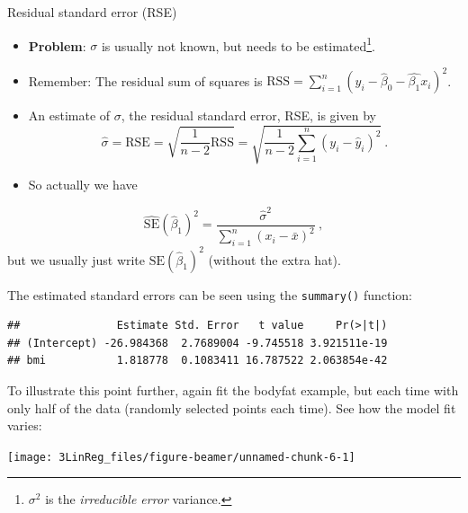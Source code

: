 \documentclass[10pt,ignorenonframetext,]{beamer}
\newenvironment{Shaded}{\begin{snugshade}}{\end{snugshade}}
\newcommand{\KeywordTok}[1]{\textcolor[rgb]{0.13,0.29,0.53}{\textbf{#1}}}
\newcommand{\OperatorTok}[1]{\textcolor[rgb]{0.81,0.36,0.00}{\textbf{#1}}}
\newcommand{\NormalTok}[1]{#1}
\begin{document}
\begin{frame}

\begin{block}{Residual standard error (RSE)}

\vspace{2mm}

\begin{itemize}
\item
  \textbf{Problem}: \(\sigma\) is usually not known, but needs to be
  estimated\footnote{$\sigma^2$ is the \emph{irreducible error} variance.}.
\item
  Remember: The residual sum of squares is
  \(\text{RSS}=\sum_{i=1}^n (y_i-\hat{\beta}_0-\hat{\beta_1}x_{i})^2\).
\item
  An estimate of \(\sigma\), the residual standard error, RSE, is given
  by
  \[\hat\sigma = \text{RSE}  =\sqrt{\frac{1}{n-2} \text{RSS}} = \sqrt{\frac{1}{n-2}\sum_{i=1}^n (y_i -\hat{y}_i)^2} \ .\]
\item
  So actually we have
\end{itemize}

\[\hat{\text{SE}}(\hat{\beta}_1)^2 = \frac{{\hat\sigma}^2}{\sum_{i=1}^n (x_i-\bar{x})^2} \ ,\]
but we usually just write \({\text{SE}}(\hat{\beta}_1)^2\) (without the
extra hat).

\end{block}

\end{frame}

\begin{frame}[fragile]

The estimated standard errors can be seen using the \texttt{summary()}
function:

\scriptsize

\begin{Shaded}
\end{Shaded}

\begin{verbatim}
##               Estimate Std. Error   t value     Pr(>|t|)
## (Intercept) -26.984368  2.7689004 -9.745518 3.921511e-19
## bmi           1.818778  0.1083411 16.787522 2.063854e-42
\end{verbatim}

\end{frame}

\begin{frame}

To illustrate this point further, again fit the bodyfat example, but
each time with only half of the data (randomly selected points each
time). See how the model fit varies:

\begin{center}\texttt{[image: 3LinReg\_files/figure-beamer/unnamed-chunk-6-1]} \end{center}

\end{frame}
\end{document}
